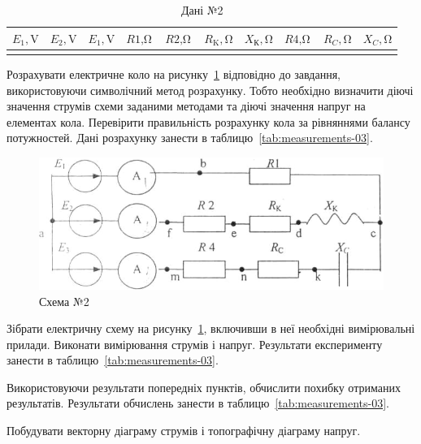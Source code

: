 \documentclass[a4paper,oneside,DIV=10,12pt]{scrartcl}
\newcommand\schel[1]{\textit{#1}}
\begin{document}
		\begin{table}[!htbp]
		\centering
			\begin{tabular}{
				S
				S
				S
				S
				S
				S
				S
				S
				S
				S
			}
				\toprule
					{$E_1, \si{\volt}$} &
					{$E_2, \si{\volt}$} &
					{$E_1, \si{\volt}$} &
					{$\schel{R1}, \si{\ohm}$} &
					{$\schel{R2}, \si{\ohm}$} &
					{$R_{\text{K}}, \si{\ohm}$} &
					{$X_{\text{К}}, \si{\ohm}$} &
					{$\schel{R4}, \si{\ohm}$} &
					{$R_C, \si{\ohm}$} &
					{$X_C, \si{\ohm}$}\\
				\midrule
					 & & & & & & & & & \\
				\bottomrule
			\end{tabular}
		\caption{Дані №2}
		\label{}
		\end{table}
		
		Розрахувати електричне коло на рисунку~\ref{fig:schematic-02} відповідно до завдання, використовуючи символічний метод розрахунку. Тобто необхідно визначити діючі значення струмів схеми заданими методами та діючі значення напруг на елементах кола. Перевірити правильність розрахунку кола за рівняннями балансу потужностей. Дані розрахунку занести в таблицю~\ref{tab:measurements-03}.
		
		\begin{figure}[!htbp]
		\centering
			\includegraphics[width=\textwidth]{schematic-02.png}
		\caption{Схема №2}
		\label{fig:schematic-02}
		\end{figure}
		
		Зібрати електричну схему на рисунку~\ref{fig:schematic-02}, включивши в неї необхідні вимірювальні прилади. Виконати вимірювання струмів і напруг. Результати експерименту занести в таблицю~\ref{tab:measurements-03}.
		
		Використовуючи результати попередніх пунктів, обчислити похибку отриманих результатів. Результати обчислень занести в таблицю~\ref{tab:measurements-03}.
		
		Побудувати векторну діаграму струмів і топографічну діаграму напруг.
		
\end{document}
